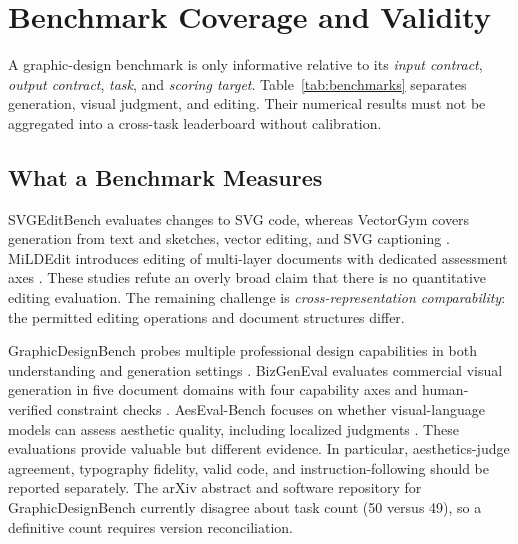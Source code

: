 \section{Benchmark Coverage and Validity}
\label{sec:benchmarks}
A graphic-design benchmark is only informative relative to its \emph{input contract}, \emph{output contract}, \emph{task}, and \emph{scoring target}. Table~\ref{tab:benchmarks} separates generation, visual judgment, and editing. Their numerical results must not be aggregated into a cross-task leaderboard without calibration.



\subsection{What a Benchmark Measures}
SVGEditBench evaluates changes to SVG code, whereas VectorGym covers generation from text and sketches, vector editing, and SVG captioning \citep{svgeditbench2024,vectorgym2026}. MiLDEdit introduces editing of multi-layer documents with dedicated assessment axes \citep{mildedit2026}. These studies refute an overly broad claim that there is no quantitative editing evaluation. The remaining challenge is \emph{cross-representation comparability}: the permitted editing operations and document structures differ.

GraphicDesignBench probes multiple professional design capabilities in both understanding and generation settings \citep{deganutti2026gdb}. BizGenEval evaluates commercial visual generation in five document domains with four capability axes and human-verified constraint checks \citep{li2026bizgeneval}. AesEval-Bench focuses on whether visual-language models can assess aesthetic quality, including localized judgments \citep{an2026aeseval}. These evaluations provide valuable but different evidence. In particular, aesthetics-judge agreement, typography fidelity, valid code, and instruction-following should be reported separately. The arXiv abstract and software repository for GraphicDesignBench currently disagree about task count (50 versus 49), so a definitive count requires version reconciliation.

